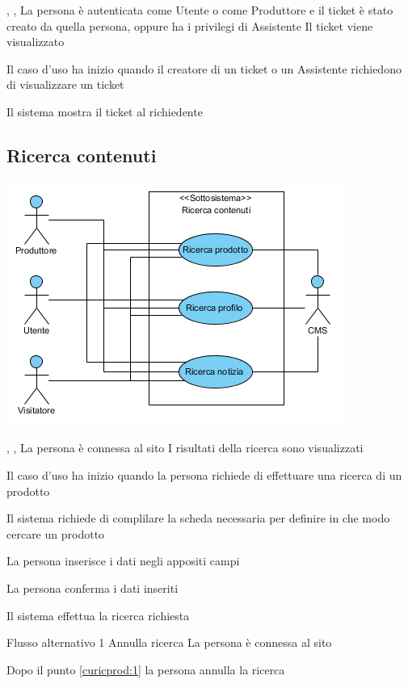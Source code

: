 \tabcuvspace

{, , }
{La persona è autenticata come Utente o come Produttore e il ticket è stato creato da quella persona, oppure ha i privilegi di Assistente}
{Il ticket viene visualizzato}
{\begin{enumCU}
	\item Il caso d'uso ha inizio quando il creatore di un ticket o un Assistente richiedono di visualizzare un ticket
	\item Il sistema mostra il ticket al richiedente
\end{enumCU}}


\subsection{Ricerca contenuti}
\begin{center}
   \includegraphics[width=\textwidth]{assets/visualParadigm/RicercaContenuti}
\end{center}
{, , }
{La persona è connessa al sito}
{I risultati della ricerca sono visualizzati}
{\begin{enumCU}
	\item Il caso d'uso ha inizio quando la persona richiede di effettuare una ricerca di un prodotto
	\item Il sistema richiede di complilare la scheda necessaria per definire in che modo cercare un prodotto
	\item La persona inserisce i dati negli appositi campi \label{curicprod:1}
	\item La persona conferma i dati inseriti
	\item Il sistema effettua la ricerca richiesta
\end{enumCU}}
%
{Flusso alternativo 1}%
{Annulla ricerca}%
{La persona è connessa al sito}%
{\postNulle}%
{\begin{enumCU}
		\item Dopo il punto \ref{curicprod:1} la persona annulla la ricerca
	\end{enumCU}}%

